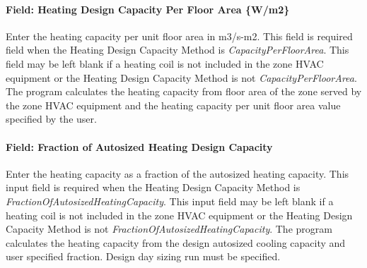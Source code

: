 \paragraph{Field: Heating Design Capacity Per Floor Area \{W/m2\}}\label{field-heating-design-capacity-per-floor-area-wm2}

Enter the heating capacity per unit floor area in m3/s-m2. This field is required field when the Heating Design Capacity Method is \emph{CapacityPerFloorArea}. This field may be left blank if a heating coil is not included in the zone HVAC equipment or the Heating Design Capacity Method is not \emph{CapacityPerFloorArea}. The program calculates the heating capacity from floor area of the zone served by the zone HVAC equipment and the heating capacity per unit floor area value specified by the user.

\paragraph{Field: Fraction of Autosized Heating Design Capacity}\label{field-fraction-of-autosized-heating-design-capacity}

Enter the heating capacity as a fraction of the autosized heating capacity. This input field is required when the Heating Design Capacity Method is \emph{FractionOfAutosizedHeatingCapacity}. This input field may be left blank if a heating coil is not included in the zone HVAC equipment or the Heating Design Capacity Method is not \emph{FractionOfAutosizedHeatingCapacity}. The program calculates the heating capacity from the design autosized cooling capacity and user specified fraction. Design day sizing run must be specified.

